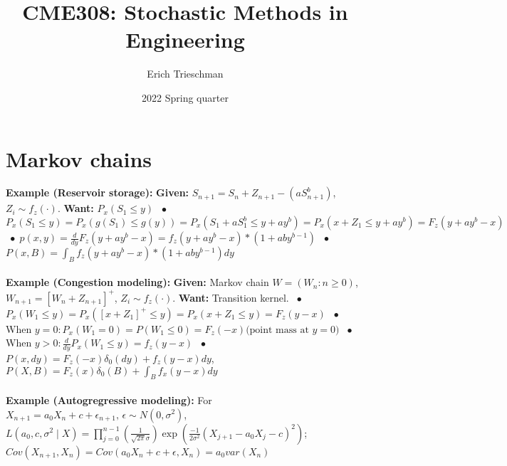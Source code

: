 \documentclass[9pt]{extarticle}
\title{CME308: Stochastic Methods in Engineering}
\author{Erich Trieschman}
\date{2022 Spring quarter}
\newcommand*\bspace{$\; \bullet \;$}
\begin{document}
\section{Markov chains}
\textbf{Example (Reservoir storage):} \textbf{Given:} $S_{n+1} = S_n +Z_{n+1} - (aS_{n+1}^b)$, $Z_i \sim f_z(\cdot)$. \textbf{Want:} $P_x(S_1 \leq y)$ \bspace $P_x(S_1 \leq y) = P_x(g(S_1) \leq g(y)) = P_x(S_1 + aS_1^b \leq y + ay^b) = P_x(x + Z_1 \leq y + ay^b) = F_z(y + ay^b - x)$ \bspace $p(x,y) = \frac{d}{dy}F_z(y + ay^b - x) = f_z(y + ay^b - x)*(1 + aby^{b-1})$ \bspace $P(x,B) = \int_Bf_z(y + ay^b - x)*(1 + aby^{b-1})dy$\\\\
\textbf{Example (Congestion modeling):} \textbf{Given:} Markov chain $W = (W_n:n\geq 0)$, $W_{n+1} = [W_n + Z_{n+1}]^+$, $Z_i \sim f_z(\cdot)$. \textbf{Want:} Transition kernel. \bspace $P_x(W_1 \leq y) = P_x([x + Z_1]^+ \leq y) = P_x(x + Z_1 \leq y) = F_z(y-x)$ \bspace When $y = 0: P_x(W_1 = 0) = P(W_1 \leq 0) = F_z(-x) \textrm{(point mass at $y=0$)}$ \bspace When $y > 0: \frac{d}{dy}P_x(W_1 \leq y) = f_z(y-x)$ \bspace $P(x,dy) = F_z(-x)\delta_0(dy) + f_z(y-x)dy$, $P(X, B) = F_z(x)\delta_0(B) + \int_Bf_x(y-x)dy$\\\\
\textbf{Example (Autogregressive modeling):} For $X_{n+1} = a_0X_n + c + \epsilon_{n+1}, \, \epsilon \sim N(0,\sigma^2)$, $L(a_0,c,\sigma^2 \mid X) = \prod_{j=0}^{n-1}(\frac{1}{\sqrt{2\pi}\sigma})\exp(\frac{-1}{2\sigma^2}(X_{j+1} - a_0X_j - c)^2)$; $Cov(X_{n+1}, X_n) = Cov(a_0X_n + c+ \epsilon, X_n) = a_0var(X_n)$
\end{document}
